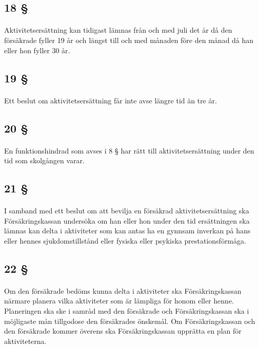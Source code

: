 \documentclass[a4paper,notitlepage,openany,10pt]{book}
\begin{document}
\subsection*{18 §}
\paragraph*{}
Aktivitetsersättning kan tidigast lämnas från och med juli det år då den försäkrade fyller 19 år och längst till och med månaden före den månad då han eller hon fyller 30 år.
\subsection*{19 §}
\paragraph*{}
Ett beslut om aktivitetsersättning får inte avse längre tid än tre år.
\subsection*{20 §}
\paragraph*{}
En funktionshindrad som avses i 8 § har rätt till aktivitetsersättning under den tid som skolgången varar.
\subsection*{21 §}
\paragraph*{}
I samband med ett beslut om att bevilja en försäkrad aktivitetsersättning ska Försäkringskassan undersöka om han eller hon under den tid ersättningen ska lämnas kan delta i aktiviteter som kan antas ha en gynnsam inverkan på hans eller hennes sjukdomstillstånd eller fysiska eller psykiska prestationsförmåga.
\subsection*{22 §}
\paragraph*{}
Om den försäkrade bedöms kunna delta i aktiviteter ska Försäkringskassan närmare planera vilka aktiviteter som är lämpliga för honom eller henne. Planeringen ska ske i samråd med den försäkrade och Försäkringskassan ska i möjligaste mån tillgodose den försäkrades önskemål. Om Försäkringskassan och den försäkrade kommer överens ska Försäkringskassan upprätta en plan för aktiviteterna.
\end{document}
